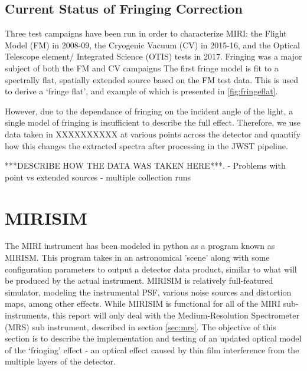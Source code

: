 \subsection{Current Status of Fringing Correction}
Three test campaigns have been run in order to characterize MIRI: the Flight Model (FM) in 2008-09, the Cryogenic Vacuum (CV) in 2015-16, and the Optical Telescope element/ Integrated Science (OTIS) tests in 2017. 
Fringing was a major subject of both the FM and CV campaigns
The first fringe model is fit to a spectrally flat, spatially extended source based on the FM test data.
This is used to derive a `fringe flat', and example of which is presented in \ref{fig:fringeflat}.


However, due to the dependance of fringing on the incident angle of the light, a single model of fringing is insufficient to describe the full effect. 
Therefore, we use data taken in XXXXXXXXXX at various points across the detector and quantify how this changes the extracted spectra after processing in the JWST pipeline.

***DESCRIBE HOW THE DATA WAS TAKEN HERE***.
- Problems with point vs extended sources
- multiple collection runs
\parencite{VanderPlas2018}

 \cite{Lahuis2018} %
\section{MIRISIM}
\cite{Consortium2018} %
\cite{Cossou2019} %
The MIRI instrument has been modeled in python as a program known as MIRISM. 
This program takes in an astronomical 'scene' along with some configuration parameters to output a detector data product, similar to what will be produced by the actual instrument.
MIRISIM is relatively full-featured simulator, modeling the instrumental PSF, various noise sources and distortion maps, among other effects.
While MIRISIM is functional for all of the MIRI sub-instruments, this report will only deal with the Medium-Resolution Spectrometer (MRS) sub instrument, described in section \ref{sec:mrs}.
The objective of this section is to describe the implementation and testing of an updated optical model of the `fringing' effect - an optical effect caused by thin film interference from the multiple layers of the detector.
